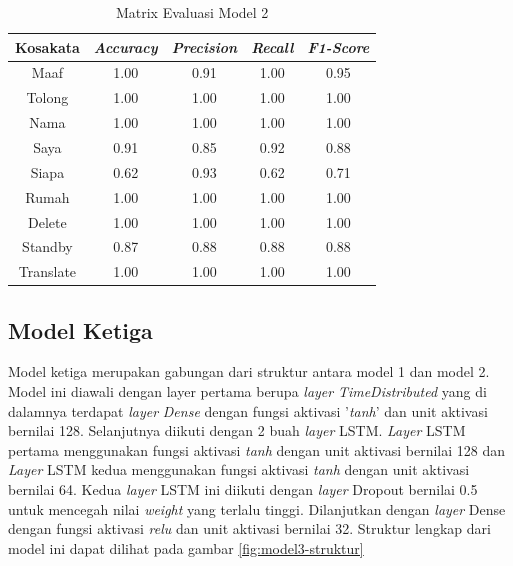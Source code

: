 \begin{longtable}{|c|c|c|c|c|}
  \caption{Matrix Evaluasi Model 2}
  \label{tb:model2stat}                                   \\
  \hline
  \rowcolor[HTML]{C0C0C0}
  \textbf{Kosakata} & \textbf{\emph{Accuracy}} & \textbf{\emph{Precision}} & \textbf{\emph{Recall}} & \textbf{\emph{F1-Score}} \\
  \hline
  Maaf              & 1.00                        & 0.91                        & 1.00                   & 0.95                \\
  Tolong            & 1.00                        & 1.00                        & 1.00                   & 1.00                \\
  Nama              & 1.00                        & 1.00                        & 1.00                   & 1.00                \\
  Saya              & 0.91                        & 0.85                        & 0.92                   & 0.88                \\
  Siapa             & 0.62                        & 0.93                        & 0.62                   & 0.71                \\
  Rumah             & 1.00                        & 1.00                        & 1.00                   & 1.00                \\
  Delete            & 1.00                        & 1.00                        & 1.00                   & 1.00                \\
  Standby           & 0.87                        & 0.88                        & 0.88                   & 0.88                \\
  Translate         & 1.00                        & 1.00                        & 1.00                   & 1.00                \\
  \hline
\end{longtable}

\subsection{Model Ketiga}
\label{sec:analisismodel3}

Model ketiga merupakan gabungan dari struktur antara model 1 dan model 2. Model ini diawali dengan layer pertama berupa \emph{layer} \textit{TimeDistributed} yang di dalamnya terdapat \emph{layer} \textit{Dense} dengan fungsi aktivasi '\textit{tanh}' dan unit aktivasi bernilai 128. Selanjutnya diikuti dengan 2 buah \emph{layer} LSTM. \emph{Layer} LSTM pertama menggunakan fungsi aktivasi \emph{tanh} dengan unit aktivasi bernilai 128 dan \emph{Layer} LSTM kedua menggunakan fungsi aktivasi \emph{tanh} dengan unit aktivasi bernilai 64. Kedua \emph{layer} LSTM ini diikuti dengan \emph{layer} Dropout bernilai 0.5 untuk mencegah nilai \emph{weight} yang terlalu tinggi. Dilanjutkan dengan \emph{layer} Dense dengan fungsi aktivasi \emph{relu} dan unit aktivasi bernilai 32. Struktur lengkap dari model ini dapat dilihat pada gambar \ref{fig:model3-struktur}

